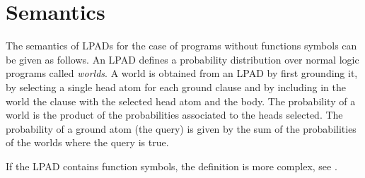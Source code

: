 \section{Semantics}
\label{semantics}

The semantics of LPADs for the case of programs without functions symbols can be given
as follows. An LPAD defines a probability distribution over normal logic programs called
\emph{worlds}. A world is obtained from an LPAD by first grounding it, by 
selecting a single head atom for each ground clause and by including in the world
the clause with the selected head atom and the body.
The probability of a world is the product of the probabilities associated to the 
heads selected.
The probability of a ground atom (the query) is given by the sum of the probabilities
of the worlds where the query is true.

If the LPAD contains function symbols, the definition is more complex, see
\cite{DBLP:journals/ai/Poole97,DBLP:journals/jair/SatoK01,Rig15-PLP-IW}.